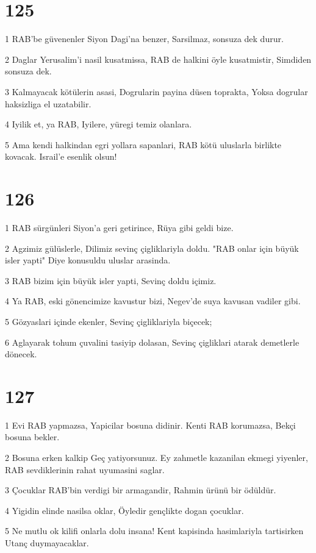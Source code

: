 \chapter{125}

\par 1 RAB'be güvenenler Siyon Dagi'na benzer, Sarsilmaz, sonsuza dek durur.
\par 2 Daglar Yerusalim'i nasil kusatmissa, RAB de halkini öyle kusatmistir, Simdiden sonsuza dek.
\par 3 Kalmayacak kötülerin asasi, Dogrularin payina düsen toprakta, Yoksa dogrular haksizliga el uzatabilir.
\par 4 Iyilik et, ya RAB, Iyilere, yüregi temiz olanlara.
\par 5 Ama kendi halkindan egri yollara sapanlari, RAB kötü uluslarla birlikte kovacak. Israil'e esenlik olsun!

\chapter{126}

\par 1 RAB sürgünleri Siyon'a geri getirince, Rüya gibi geldi bize.
\par 2 Agzimiz gülüslerle, Dilimiz sevinç çigliklariyla doldu. "RAB onlar için büyük isler yapti" Diye konusuldu uluslar arasinda.
\par 3 RAB bizim için büyük isler yapti, Sevinç doldu içimiz.
\par 4 Ya RAB, eski gönencimize kavustur bizi, Negev'de suya kavusan vadiler gibi.
\par 5 Gözyaslari içinde ekenler, Sevinç çigliklariyla biçecek;
\par 6 Aglayarak tohum çuvalini tasiyip dolasan, Sevinç çigliklari atarak demetlerle dönecek.

\chapter{127}

\par 1 Evi RAB yapmazsa, Yapicilar bosuna didinir. Kenti RAB korumazsa, Bekçi bosuna bekler.
\par 2 Bosuna erken kalkip Geç yatiyorsunuz. Ey zahmetle kazanilan ekmegi yiyenler, RAB sevdiklerinin rahat uyumasini saglar.
\par 3 Çocuklar RAB'bin verdigi bir armagandir, Rahmin ürünü bir ödüldür.
\par 4 Yigidin elinde nasilsa oklar, Öyledir gençlikte dogan çocuklar.
\par 5 Ne mutlu ok kilifi onlarla dolu insana! Kent kapisinda hasimlariyla tartisirken Utanç duymayacaklar.

